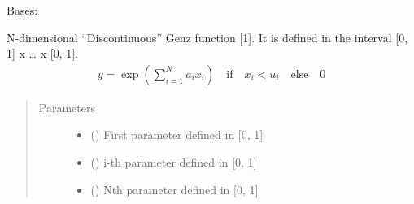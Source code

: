 \documentclass[letterpaper,10pt,english,openany,oneside]{sphinxmanual}
\begin{document}
\begin{fulllineitems}
\label{\detokenize{pygpc.testfunctions:pygpc.testfunctions.testfunctions.GenzDiscontinuous}}
Bases: {\hyperref[\detokenize{pygpc:pygpc.AbstractModel.AbstractModel}]{}}

N-dimensional “Discontinuous” Genz function {[}1{]}. It is defined in the interval {[}0, 1{]} x … x {[}0, 1{]}.
\begin{equation*}
\begin{split}y = \exp\left( \sum_{i=1}^N a_i x_i\right) \quad \mathrm{if} \quad x_i < u_i \quad \mathrm{else} \quad 0\end{split}
\end{equation*}\begin{quote}\begin{description}
\item[{Parameters}] \leavevmode\begin{itemize}
\item {} 
\sphinxstyleliteralstrong{\sphinxupquote{{[}}}\sphinxstyleliteralstrong{\sphinxupquote{{]}}} (\sphinxstyleliteralemphasis{\sphinxupquote{ {[}}}\sphinxstyleliteralemphasis{\sphinxupquote{{]}}}) \textendash{} First parameter defined in {[}0, 1{]}

\item {} 
\sphinxstyleliteralstrong{\sphinxupquote{{[}}}\sphinxstyleliteralstrong{\sphinxupquote{{]}}} (\sphinxstyleliteralemphasis{\sphinxupquote{ {[}}}\sphinxstyleliteralemphasis{\sphinxupquote{{]}}}) \textendash{} i-th parameter defined in {[}0, 1{]}

\item {} 
\sphinxstyleliteralstrong{\sphinxupquote{{[}}}\sphinxstyleliteralstrong{\sphinxupquote{{]}}} (\sphinxstyleliteralemphasis{\sphinxupquote{ {[}}}\sphinxstyleliteralemphasis{\sphinxupquote{{]}}}) \textendash{} Nth parameter defined in {[}0, 1{]}


\end{itemize}
\end{description}
\end{quote}
\end{fulllineitems}
\end{document}
